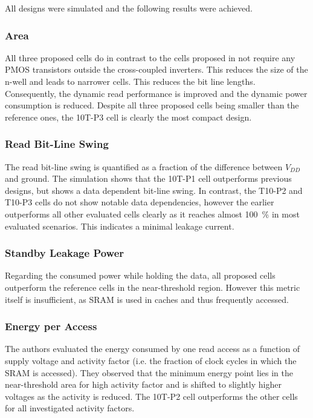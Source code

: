 \documentclass[conference]{IEEEtran}
\begin{document}
All designs were simulated and the following results were achieved.

\subsubsection{Area}
All three proposed cells do in contrast to the cells proposed in \cite{Calhoun2007, Kim2008, Pasandi2015} not require any PMOS transistors outside the cross-coupled inverters. This reduces the size of the n-well and leads to narrower cells. This reduces the bit line lengths. Consequently, the dynamic read performance is improved and the dynamic power consumption is reduced. Despite all three proposed cells being smaller than the reference ones, the 10T-P3 cell is clearly the most compact design.

\subsubsection{Read Bit-Line Swing}
The read bit-line swing is quantified as a fraction of the difference between $V_{DD}$ and ground. The simulation shows that the 10T-P1 cell outperforms previous designs, but shows a data dependent bit-line swing. In contrast, the T10-P2 and T10-P3 cells do not show notable data dependencies, however the earlier outperforms all other evaluated cells clearly as it reaches almost \SI{100}{\%} in most evaluated scenarios. This indicates a minimal leakage current.

\subsubsection{Standby Leakage Power}
Regarding the consumed power while holding the data, all proposed cells outperform the reference cells in the near-threshold region. However this metric itself is insufficient, as SRAM is used in caches and thus frequently accessed.

\subsubsection{Energy per Access}
The authors evaluated the energy consumed by one read access as a function of supply voltage and activity factor (i.e. the fraction of clock cycles in which the SRAM is accessed). They observed that the minimum energy point lies in the near-threshold area for high activity factor and is shifted to slightly higher voltages as the activity is reduced. The 10T-P2 cell outperforms the other cells for all investigated activity factors.
\end{document}
